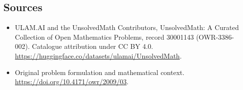 \documentclass[11pt]{article}
\begin{document}
\subsection{Sources}
\begin{itemize}
\item[\hypertarget{source:30001143:1}{S1}] ULAM.AI and the UnsolvedMath Contributors, UnsolvedMath: A Curated Collection of Open Mathematics Problems, record 30001143 (OWR-3386-002). Catalogue attribution under CC BY 4.0.
\url{https://huggingface.co/datasets/ulamai/UnsolvedMath}.
\item[\hypertarget{source:30001143:2}{S2}] Original problem formulation and mathematical context.
\url{https://doi.org/10.4171/owr/2009/03}.
\end{itemize}
\label{end:30001143}
\end{document}
